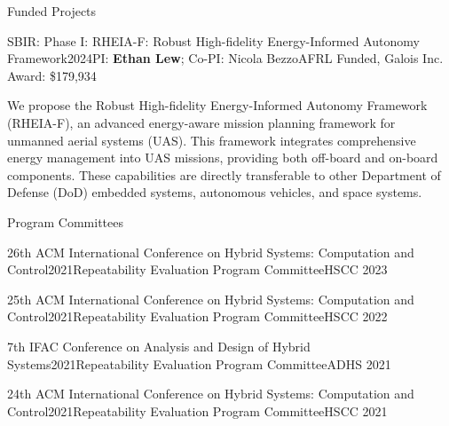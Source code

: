 \documentclass{resume}
\begin{document}
\begin{rSection}{Funded Projects}
\begin{rSubsection}{SBIR: Phase I: RHEIA-F: Robust High-fidelity Energy-Informed Autonomy Framework}{2024}{PI: \textbf{Ethan Lew}; Co-PI: Nicola Bezzo}{AFRL Funded, Galois Inc. Award: \$179,934}
\item We propose the Robust High-fidelity Energy-Informed Autonomy Framework (RHEIA-F), an advanced energy-aware mission planning framework for unmanned aerial systems (UAS). This framework integrates comprehensive energy management into UAS missions, providing both off-board and on-board components. These capabilities are directly transferable to other Department of Defense (DoD) embedded systems, autonomous vehicles, and space systems.
\end{rSubsection}
\end{rSection}


\begin{rSection}{Program Committees}

\begin{rSubsectionEmpty}{26th ACM International Conference on Hybrid Systems: Computation and Control}{2021}{Repeatability Evaluation Program Committee}{HSCC 2023}
\end{rSubsectionEmpty}

\begin{rSubsectionEmpty}{25th ACM International Conference on Hybrid Systems: Computation and Control}{2021}{Repeatability Evaluation Program Committee}{HSCC 2022}
\end{rSubsectionEmpty}


\begin{rSubsectionEmpty}{7th IFAC Conference on Analysis and Design of Hybrid Systems}{2021}{Repeatability Evaluation Program Committee}{ADHS 2021}
\end{rSubsectionEmpty}

\begin{rSubsectionEmpty}{24th ACM International Conference on Hybrid Systems: Computation and Control}{2021}{Repeatability Evaluation Program Committee}{HSCC 2021}
\end{rSubsectionEmpty}

\end{rSection}
\end{document}
